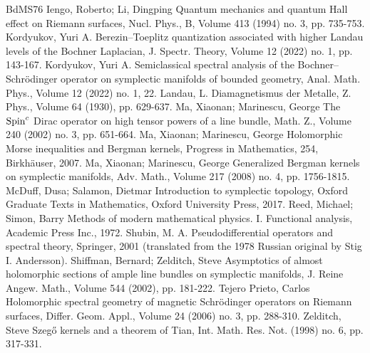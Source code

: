 \begin{thebibliography}{BdMS76}
 Iengo, Roberto; Li, Dingping Quantum mechanics and quantum Hall effect on Riemann surfaces, Nucl. Phys., B, Volume 413 (1994) no. 3, pp. 735-753.
 Kordyukov, Yuri A. Berezin–Toeplitz quantization associated with higher Landau levels of the Bochner Laplacian, J. Spectr. Theory, Volume 12 (2022) no. 1, pp. 143-167.
 Kordyukov, Yuri A. Semiclassical spectral analysis of the Bochner–Schrödinger operator on symplectic manifolds of bounded geometry, Anal. Math. Phys., Volume 12 (2022) no. 1, 22.
 Landau, L. Diamagnetismus der Metalle, Z. Phys., Volume 64 (1930), pp. 629-637.
 Ma, Xiaonan; Marinescu, George The ${\rm {Spin}}^c$ Dirac operator on high tensor powers of a line bundle, Math. Z., Volume 240 (2002) no. 3, pp. 651-664.
 Ma, Xiaonan; Marinescu, George Holomorphic Morse inequalities and Bergman kernels, Progress in Mathematics, 254, Birkhäuser, 2007.
 Ma, Xiaonan; Marinescu, George Generalized Bergman kernels on symplectic manifolds, Adv. Math., Volume 217 (2008) no. 4, pp. 1756-1815.
 McDuff, Dusa; Salamon, Dietmar Introduction to symplectic topology, Oxford Graduate Texts in Mathematics, Oxford University Press, 2017.
 Reed, Michael; Simon, Barry Methods of modern mathematical physics. I. Functional analysis, Academic Press Inc., 1972.
 Shubin, M. A. Pseudodifferential operators and spectral theory, Springer, 2001 (translated from the 1978 Russian original by Stig I. Andersson).
 Shiffman, Bernard; Zelditch, Steve Asymptotics of almost holomorphic sections of ample line bundles on symplectic manifolds, J. Reine Angew. Math., Volume 544 (2002), pp. 181-222.
 Tejero Prieto, Carlos Holomorphic spectral geometry of magnetic Schrödinger operators on Riemann surfaces, Differ. Geom. Appl., Volume 24 (2006) no. 3, pp. 288-310.
 Zelditch, Steve Szegő kernels and a theorem of Tian, Int. Math. Res. Not. (1998) no. 6, pp. 317-331.
\end{thebibliography}
